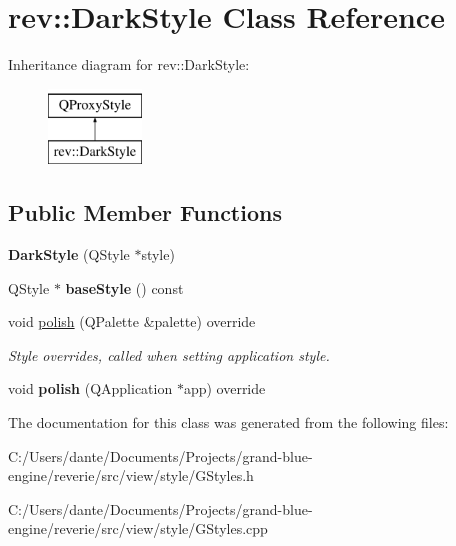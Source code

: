 \hypertarget{classrev_1_1_dark_style}{}\section{rev\+::Dark\+Style Class Reference}
\label{classrev_1_1_dark_style}
Inheritance diagram for rev\+::Dark\+Style\+:\begin{figure}[H]
\begin{center}
\leavevmode
\includegraphics[height=2.000000cm]{classrev_1_1_dark_style}
\end{center}
\end{figure}
\subsection*{Public Member Functions}
\begin{DoxyCompactItemize}
\item 
\mbox{\label{classrev_1_1_dark_style_a607392b8b0b03833599d975767304f97}} 
{\bfseries Dark\+Style} (Q\+Style $\ast$style)
\item 
\mbox{\label{classrev_1_1_dark_style_a3cc4ba17fc4e317fee0bcc2fd1addce2}} 
Q\+Style $\ast$ {\bfseries base\+Style} () const
\item 
\mbox{\label{classrev_1_1_dark_style_ab7914e06f46b761a7e02456798a23b1e}} 
void \mbox{\hyperlink{classrev_1_1_dark_style_ab7914e06f46b761a7e02456798a23b1e}{polish}} (Q\+Palette \&palette) override
\begin{DoxyCompactList}\small\item\em Style overrides, called when setting application style. \end{DoxyCompactList}\item 
\mbox{\label{classrev_1_1_dark_style_a15684352bcbe0dc571ff6f5327adaa71}} 
void {\bfseries polish} (Q\+Application $\ast$app) override
\end{DoxyCompactItemize}


The documentation for this class was generated from the following files\+:\begin{DoxyCompactItemize}
\item 
C\+:/\+Users/dante/\+Documents/\+Projects/grand-\/blue-\/engine/reverie/src/view/style/G\+Styles.\+h\item 
C\+:/\+Users/dante/\+Documents/\+Projects/grand-\/blue-\/engine/reverie/src/view/style/G\+Styles.\+cpp\end{DoxyCompactItemize}
